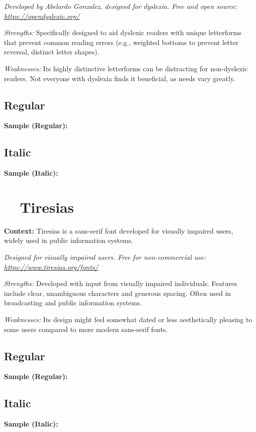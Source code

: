 \emph{Developed by Abelardo Gonzalez, designed for dyslexia. Free and open source: \url{https://opendyslexic.org/}}
\begin{raggedright}
	\emph{Strengths:} Specifically designed to aid dyslexic readers with unique letterforms that prevent common reading errors (e.g., weighted bottoms to prevent letter reversal, distinct letter shapes).

	\emph{Weaknesses:} Its highly distinctive letterforms can be distracting for non-dyslexic readers. Not everyone with dyslexia finds it beneficial, as  needs vary greatly.

	\subsection{Regular}
	\noindent\textbf{Sample (Regular):}
	\FontSample{\opendyslexicfont}

	\subsection{Italic}
	\noindent\textbf{Sample (Italic):}
	\FontSample{{\opendyslexicfont\itshape}}
\end{raggedright}


\pagebreak
\section{~~Tiresias}\label{app5:sec:tiresias}
\noindent
\textbf{Context:} Tiresias is a sans-serif font developed for visually impaired users, widely used in public information systems.

\emph{Designed for visually impaired users. Free for non-commercial use: \url{https://www.tiresias.org/fonts/}}
\begin{raggedright}
	\emph{Strengths:} Developed with input from visually impaired individuals. Features include clear, unambiguous characters and generous spacing. Often used in broadcasting and public information systems.

	\emph{Weaknesses:} Its design might feel somewhat dated or less aesthetically pleasing to some users compared to more modern sans-serif fonts.

	\subsection{Regular}
	\noindent\textbf{Sample (Regular):}
	\FontSample{\tiresiasfont}

	\subsection{Italic}
	\noindent\textbf{Sample (Italic):}
	\FontSample{{\tiresiasfont\itshape}}
\end{raggedright}


